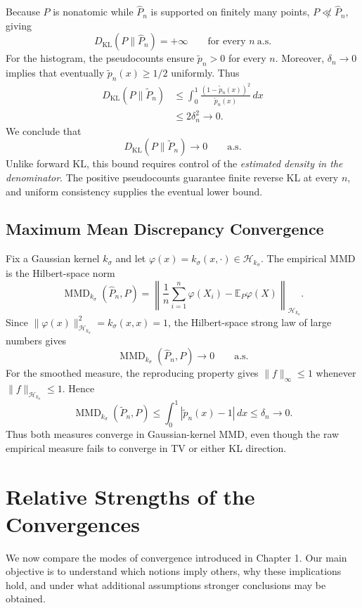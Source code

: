 \documentclass[
  11pt,
  a4paper,
  notitlepage
]{report}
\begin{document}
Because \(P\) is nonatomic while \(\widehat P_n\) is supported on
finitely many points, \(P\not\ll\widehat P_n\), giving \[
\boxed{D_{\mathrm{KL}}(P\|\widehat P_n)=+\infty
\qquad\text{for every }n\ \mathrm{a.s.}}
\] For the histogram, the pseudocounts ensure \(\widetilde p_n>0\) for
every \(n\). Moreover, \(\delta_n\to0\) implies that eventually
\(\widetilde p_n(x)\ge1/2\) uniformly. Thus \[
\begin{aligned}
D_{\mathrm{KL}}(P\|\widetilde P_n)
&\le\int_0^1\frac{(1-\widetilde p_n(x))^2}{\widetilde p_n(x)}\,dx\\
&\le2\delta_n^2\longrightarrow0.
\end{aligned}
\] We conclude that \[
\boxed{D_{\mathrm{KL}}(P\|\widetilde P_n)\longrightarrow0
\qquad\mathrm{a.s.}}
\] Unlike forward KL, this bound requires control of the \emph{estimated
density in the denominator}. The positive pseudocounts guarantee finite
reverse KL at every \(n\), and uniform consistency supplies the eventual
lower bound.

\section{Maximum Mean Discrepancy
Convergence}\label{maximum-mean-discrepancy-convergence}

Fix a Gaussian kernel \(k_\sigma\) and let
\(\varphi(x)=k_\sigma(x,\cdot)\in\mathcal H_{k_\sigma}\). The empirical
MMD is the Hilbert-space norm \[
\operatorname{MMD}_{k_\sigma}(\widehat P_n,P)
=\left\|\frac1n\sum_{i=1}^n\varphi(X_i)
-\mathbb E_P\varphi(X)\right\|_{\mathcal H_{k_\sigma}}.
\] Since \(\|\varphi(x)\|_{\mathcal H_{k_\sigma}}^2=k_\sigma(x,x)=1\),
the Hilbert-space strong law of large numbers gives \[
\boxed{\operatorname{MMD}_{k_\sigma}(\widehat P_n,P)
\longrightarrow0\qquad\mathrm{a.s.}}
\] For the smoothed measure, the reproducing property gives
\(\|f\|_\infty\le1\) whenever \(\|f\|_{\mathcal H_{k_\sigma}}\le1\).
Hence \[
\operatorname{MMD}_{k_\sigma}(\widetilde P_n,P)
\le\int_0^1|\widetilde p_n(x)-1|\,dx
\le\delta_n\longrightarrow0.
\] Thus both measures converge in Gaussian-kernel MMD, even though the
raw empirical measure fails to converge in TV or either KL direction.

\chapter{Relative Strengths of the Convergences}
\label{relative-strengths-of-the-convergences}

We now compare the modes of convergence introduced in
Chapter 1. Our main objective is to understand which notions
imply others, why these implications hold, and under what
additional assumptions stronger conclusions may be obtained.
\end{document}

